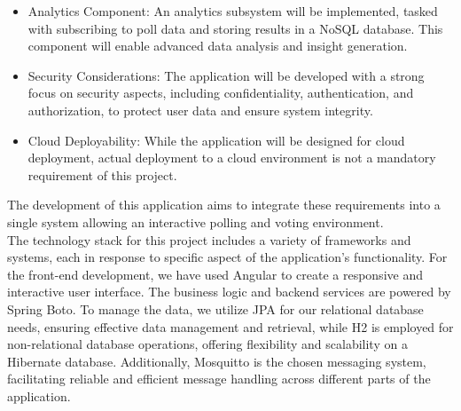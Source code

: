 \begin{itemize}
\item Analytics Component: An analytics subsystem will be implemented, tasked with subscribing to poll data and storing results in a NoSQL database. This component will enable advanced data analysis and insight generation.

\item Security Considerations: The application will be developed with a strong focus on security aspects, including confidentiality, authentication, and authorization, to protect user data and ensure system integrity.

\item Cloud Deployability: While the application will be designed for cloud deployment, actual deployment to a cloud environment is not a mandatory requirement of this project.
\end{itemize}

\noindent The development of this application aims to integrate these requirements into a single system allowing an interactive polling and voting environment.\\


\noindent The technology stack for this project includes a variety of frameworks and systems, each in response to specific aspect of the application's functionality. For the front-end development, we have used Angular to create a responsive and interactive user interface. The business logic and backend services are powered by Spring Boto. To manage the data, we utilize JPA for our relational database needs, ensuring effective data management and retrieval, while H2  is employed for non-relational database operations, offering flexibility and scalability on a Hibernate database. Additionally, Mosquitto is the chosen messaging system, facilitating reliable and efficient message handling across different parts of the application. \\

